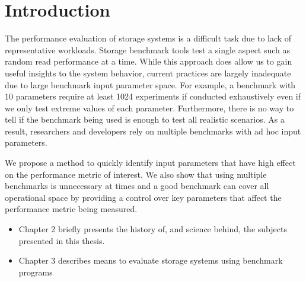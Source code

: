 \chapter{Introduction}
\label{intro_chapter}




The performance evaluation of storage systems is a difficult task due to lack of representative workloads. Storage benchmark tools test a single aspect such as random read performance at a time. While this approach does allow us to gain useful insights to the system behavior, current practices are largely inadequate due to large benchmark input parameter space. For example, a benchmark with 10 parameters require at least 1024 experiments if conducted exhaustively even if we only test extreme values of each parameter. Furthermore, there is no way to tell if the benchmark being used is enough to test all realistic scenarios. As a result, researchers and developers rely on multiple benchmarks with ad hoc input parameters.

We propose a method to quickly identify input parameters that have high effect on the performance metric of interest. We also show that using multiple benchmarks is unnecessary at times and a good benchmark can cover all operational space by providing a control over key parameters that affect the performance metric being measured. 


\begin{itemize}


\item Chapter 2 briefly presents the history of, and science behind, the
subjects presented in this thesis.

\item Chapter 3 describes means to evaluate storage systems using benchmark programs

\end{itemize}
